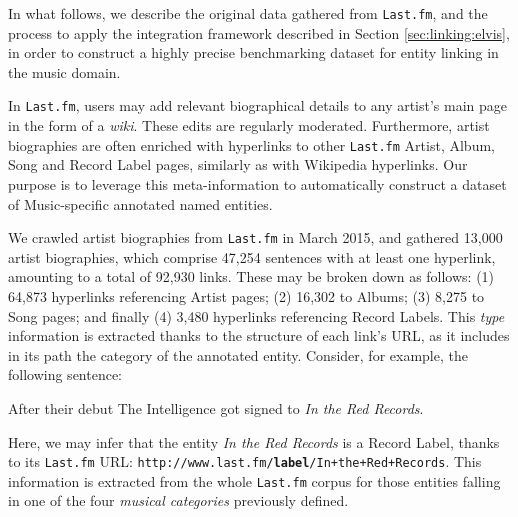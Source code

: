 In what follows, we describe the original data gathered from \texttt{Last.fm}, and the process to apply the integration framework described in Section \ref{sec:linking:elvis}, in order to construct a highly precise benchmarking dataset for entity linking in the music domain.


In \texttt{Last.fm}, users may add relevant biographical details to any artist's main page in the form of a \textit{wiki}. These edits are regularly moderated. Furthermore, artist biographies are often enriched with hyperlinks to other \texttt{Last.fm} Artist, Album, Song and Record Label pages, similarly as with Wikipedia hyperlinks. Our purpose is to leverage this meta-information to automatically construct a dataset of Music-specific annotated named entities.%

We crawled artist biographies from \texttt{Last.fm} in March 2015, and gathered 13,000 artist biographies, which comprise 47,254 sentences with at least one hyperlink, amounting to a total of 92,930 links. These may be broken down as follows: (1) 64,873 hyperlinks referencing Artist pages; (2) 16,302 to Albums; (3) 8,275 to Song pages; and finally (4) 3,480 hyperlinks referencing Record Labels. This \textit{type} information is extracted thanks to the structure of each link's URL, as it includes in its path the category of the annotated entity. Consider, for example, the following sentence:

\begin{adjustwidth}{2.5em}{20pt}
\begin{center}
After their debut The Intelligence got signed to \textit{In the Red Records}.\\
\end{center}
\end{adjustwidth}


Here, we may infer that the entity \textit{In the Red Records} is a Record Label, thanks to its \texttt{Last.fm} URL: {\footnotesize{\texttt{http://www.last.fm/{\normalsize\textbf{label}}/In+the+Red+Records}}}. This information is extracted from the whole \texttt{Last.fm} corpus for those entities falling in one of the four \textit{musical categories} previously defined.


